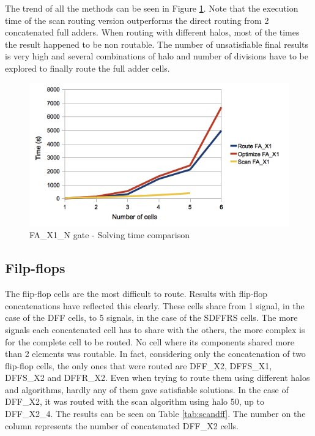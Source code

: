 The trend of all the methods can be seen in Figure \ref{fig:scanadder}. Note that the execution time of the scan routing version outperforms the direct routing from 2 concatenated full adders. When routing with different halos, most of the times the result happened to be non routable. The number of unsatisfiable final results is very high and several combinations of halo and number of divisions have to be explored to finally route the full adder cells. \\

\begin{figure}[h!]
  \centering
  \includegraphics[scale=0.7]{img/results/scanadder.png}
  \caption{FA\_X1\_N gate - Solving time comparison}
  \label{fig:scanadder}
\end{figure} 

\subsection{Filp-flops}

The flip-flop cells are the most difficult to route. Results with flip-flop concatenations have reflected this clearly. These cells share from 1 signal, in the case of the DFF cells, to 5 signals, in the case of the SDFFRS cells. The more signals each concatenated cell has to share with the others, the more complex is for the complete cell to be routed. No cell where its components shared more than 2 elements was routable. In fact, considering only the concatenation of two flip-flop cells, the only ones that were routed are DFF\_X2, DFFS\_X1, DFFS\_X2 and DFFR\_X2. Even when trying to route them using different halos and algorithms, hardly any of them gave satisfiable solutions.  In the case of DFF\_X2, it was routed with the scan algorithm using halo 50, up to DFF\_X2\_4. The results can be seen on Table \ref{tab:scandff}. The number on the column represents the number of concatenated DFF\_X2 cells.\\

